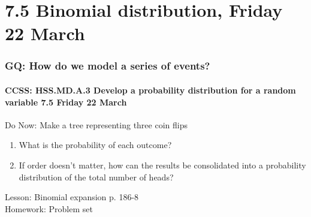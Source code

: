 \documentclass{beamer}
\begin{document}
\section{7.5 Binomial distribution, Friday 22 March}
  \frame
  {
    \frametitle{GQ: How do we model a series of events?}
    \framesubtitle{CCSS: HSS.MD.A.3 Develop a probability distribution for a random variable \hfill \alert{7.5 Friday 22 March}}

    \begin{block}{Do Now: Make a tree representing three coin flips}
    \begin{enumerate}
        \item What is the probability of each outcome?
        \item If order doesn't matter, how can the results be consolidated into a probability distribution of the total number of heads?
    \end{enumerate}
    \end{block}
    Lesson:  Binomial expansion p. 186-8\\%
    Homework: Problem set
  }
\end{document}
